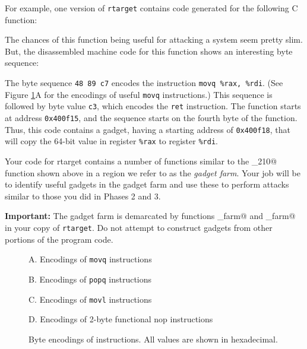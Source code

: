 \documentclass[11pt]{article}
\newcommand{\reg}[1]{\textrm{\texttt{\%#1}}}
\newcommand{\raxreg}{\reg{rax}}
\newcommand{\rdireg}{\reg{rdi}}
\newenvironment{ccode}%
{\small}%
{}
\begin{document}
For example, one version of {\tt rtarget} contains code generated for the 
following C function:

\begin{ccode}

\end{ccode}

The chances of this function being useful for attacking a system seem
pretty slim.  But, the disassembled 
machine code for this function shows an interesting byte sequence:

\begin{ccode}

\end{ccode}

The byte sequence {\tt 48 89 c7} encodes the instruction
{\tt movq \raxreg, \rdireg}.
(See Figure \ref{fig:encode}A for the encodings of useful {\tt movq} instructions.)
This sequence is followed by byte value {\tt c3}, which encodes the
{\tt ret} instruction.
The function starts at address {\tt 0x400f15}, and the sequence starts
on the fourth byte of the function.  Thus, this code contains a
gadget, 
having a starting address of {\tt 0x400f18},
that will copy the 64-bit value in register \raxreg{} to register \rdireg{}.

Your code for {\sc rtarget} contains a number of functions similar to
the \verb@setval_210@ function shown above in a region we refer to as
the {\em gadget farm}.  Your job will be to identify useful gadgets in
the gadget farm and use these to perform attacks similar to those you
did in Phases 2 and 3.

{\bf Important:} The gadget farm is demarcated by functions
\verb@start_farm@ and \verb@end_farm@ in your copy of {\tt rtarget}.
Do not attempt to construct gadgets from other portions of the program code.

\begin{figure}
A. Encodings of {\tt movq} instructions
\begin{center}
\small

\end{center}
B. Encodings of {\tt popq} instructions
\begin{center}
\small

\end{center}
C. Encodings of {\tt movl} instructions
\begin{center}
\small

\end{center}
D. Encodings of 2-byte functional nop instructions
\begin{center}
\small

\end{center}
\caption{Byte encodings of instructions.  All values are shown in hexadecimal.}
\label{fig:encode}
\end{figure}
\end{document}
